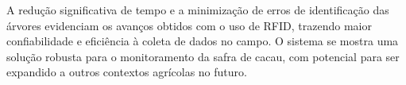 A redução significativa de tempo e a minimização de erros de identificação das árvores evidenciam os avanços obtidos com o uso de RFID, trazendo maior confiabilidade e eficiência à coleta de dados no campo. O sistema se mostra uma solução robusta para o monitoramento da safra de cacau, com potencial para ser expandido a outros contextos agrícolas no futuro.
